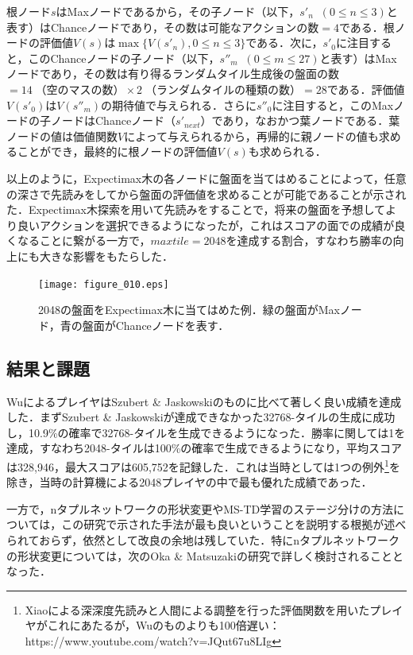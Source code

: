 \documentclass{suribt}
\begin{document}
根ノード$s$はMaxノードであるから，その子ノード（以下，$s'_n \;\; (0 \leq n \leq 3)$と表す）はChanceノードであり，その数は可能なアクションの数$=4$である．根ノードの評価値$V(s)$は$\max\{V(s'_n), 0 \leq n \leq 3\}$である．次に，$s'_0$に注目すると，このChanceノードの子ノード（以下，$s''_m \;\; (0 \leq m \leq 27)$と表す）はMaxノードであり，その数は有り得るランダムタイル生成後の盤面の数$=14 \; \text{（空のマスの数）} \times 2 \; \text{（ランダムタイルの種類の数）} = 28$である．評価値$V(s'_0)$は$V(s''_m)$の期待値で与えられる．さらに$s''_0$に注目すると，このMaxノードの子ノードはChanceノード（$s'_{next}$）であり，なおかつ葉ノードである．葉ノードの値は価値関数$V$によって与えられるから，再帰的に親ノードの値も求めることができ，最終的に根ノードの評価値$V(s)$も求められる．

以上のように，Expectimax木の各ノードに盤面を当てはめることによって，任意の深さで先読みをしてから盤面の評価値を求めることが可能であることが示された．Expectimax木探索を用いて先読みをすることで，将来の盤面を予想してより良いアクションを選択できるようになったが，これはスコアの面での成績が良くなることに繋がる一方で，$maxtile=2048$を達成する割合，すなわち勝率の向上にも大きな影響をもたらした．

\begin{figure}[t]
	\begin{center}
	\texttt{[image: figure\_010.eps]}
	\caption{2048の盤面をExpectimax木に当てはめた例．緑の盤面がMaxノード，青の盤面がChanceノードを表す．}
	\label{figure_010}
	\end{center}
\end{figure}

\subsection{結果と課題}
WuによるプレイヤはSzubert \& Jaskowskiのものに比べて著しく良い成績を達成した．まずSzubert \& Jaskowskiが達成できなかった32768-タイルの生成に成功し，10.9\%の確率で32768-タイルを生成できるようになった．勝率に関しては1を達成，すなわち2048-タイルは100\%の確率で生成できるようになり，平均スコアは328,946，最大スコアは605,752を記録した．これは当時としては1つの例外\footnote{Xiaoによる深深度先読みと人間による調整を行った評価関数を用いたプレイヤがこれにあたるが，Wuのものよりも100倍遅い：https://www.youtube.com/watch?v=JQut67u8LIg}を除き，当時の計算機による2048プレイヤの中で最も優れた成績であった．

一方で，nタプルネットワークの形状変更やMS-TD学習のステージ分けの方法については，この研究で示された手法が最も良いということを説明する根拠が述べられておらず，依然として改良の余地は残していた．特にnタプルネットワークの形状変更については，次のOka \& Matsuzakiの研究で詳しく検討されることとなった．
\end{document}
